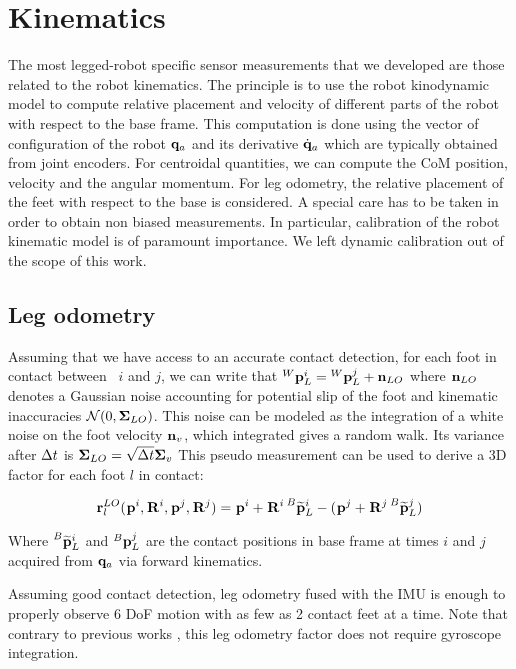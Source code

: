 \chapter{Kinematics}
\minitoc

The most legged-robot specific sensor measurements that we developed are those related to the robot kinematics. 
The principle is to use the robot kinodynamic model to compute relative placement and velocity of different parts of the robot 
with respect to the base frame. This computation is done using the vector of configuration of the robot ${\bf q}_a$ and its derivative $\dot{{\bf q}}_a$ which
are typically obtained from joint encoders.
For centroidal quantities, we can compute the CoM position, velocity and the angular momentum.
For leg odometry, the relative placement of the feet with respect to the base is considered. A special care has to be taken in order to
obtain non biased measurements. In particular, calibration of the robot kinematic model is of paramount importance. We left dynamic calibration 
out of the scope of this work.

\section{Leg odometry}
Assuming that we have access to an accurate contact detection, for each foot in contact between \keyframes~$i$ and $j$, we can write that 
$\prescript{W}{}{{\bf p}}_{L}^i = \prescript{W}{}{{\bf p}}_{L}^j + {\bf n}_{LO}$ where ${\bf n}_{LO}$ denotes a Gaussian noise accounting for potential slip of the foot and kinematic inaccuracies 
$\mathcal{N}({0},{{\bm \Sigma}_{LO}})$.
This noise can be modeled as the integration of a white noise on the foot velocity ${\bf n}_v$, which integrated gives a random walk.  
Its variance after $\Delta t$ is ${\bm \Sigma}_{LO} = \sqrt{\Delta t} {\bm \Sigma}_v$
This pseudo measurement can be used to derive a 3D factor for each foot $l$ in contact:

\begin{equation}
    {\bf r}^{LO}_l(\prescript{}{}{{\bf p}}_{}^i, \prescript{}{}{{\bf R}}_{}^i, \prescript{}{}{{\bf p}}_{}^j, \prescript{}{}{{\bf R}}_{}^j) = \prescript{}{}{{\bf p}}_{}^i + \prescript{}{}{{\bf R}}_{}^i \prescript{B}{}{\widetilde{{\bf p}}}_{L}^i - (\prescript{}{}{{\bf p}}_{}^j + \prescript{}{}{{\bf R}}_{}^j \prescript{B}{}{\widetilde{{\bf p}}}_{L}^j)
\end{equation}

Where $\prescript{B}{}{\widetilde{{\bf p}}}_{L}^i$ and $\prescript{B}{}{{\bf p}}_{L}^j$ are the contact positions in base frame at times $i$ and $j$ acquired from ${\bf q}_a$ via forward kinematics. 

Assuming good contact detection, leg odometry fused with the IMU is enough to properly observe 6 DoF motion with as few as 2 contact feet at a time. 
Note that contrary to previous works \cite{hartley2018legged, wisth2020preintegrated}, this leg odometry factor does not require gyroscope integration.


